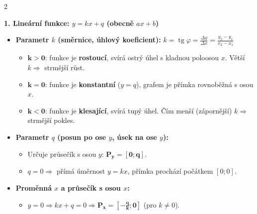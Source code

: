 \documentclass[9pt,a4paper]{article}
\begin{document}
\begin{tcolorbox}[secbox,title=OKRUH 4: LINEÁRNÍ A KVADRATICKÉ FUNKCE -- ROZBOR PARAMETRŮ A GRAFY]
\begin{multicols}{2}

\textbf{\large 1. Lineární funkce: $y = kx + q$ (obecně $ax + b$)}
\begin{itemize}
  \item \textbf{Parametr $k$ (směrnice, úhlový koeficient):} $k = \operatorname{tg} \varphi = \frac{\Delta y}{\Delta x} = \frac{y_2 - y_1}{x_2 - x_1}$
  \begin{itemize}
    \item $\mathbf{k > 0}$: funkce je \textbf{rostoucí}, svírá ostrý úhel s kladnou poloosou $x$. Větší $k \Rightarrow$ strmější růst.
    \item $\mathbf{k = 0}$: funkce je \textbf{konstantní} ($y = q$), grafem je přímka rovnoběžná s osou $x$.
    \item $\mathbf{k < 0}$: funkce je \textbf{klesající}, svírá tupý úhel. Čím menší (zápornější) $k \Rightarrow$ strmější pokles.
  \end{itemize}
  \item \textbf{Parametr $q$ (posun po ose $y$, úsek na ose $y$):}
  \begin{itemize}
    \item Určuje průsečík s osou $y$: $\mathbf{P_y = [0; q]}$.
    \item $q = 0 \Rightarrow$ přímá úměrnost $y = kx$, přímka prochází počátkem $[0;0]$.
  \end{itemize}
  \item \textbf{Proměnná $x$ a průsečík s osou $x$:}
  \begin{itemize}
    \item $y = 0 \Rightarrow kx + q = 0 \Rightarrow \mathbf{P_x = \left[-\frac{q}{k}; 0\right]}$ (pro $k \neq 0$).
  \end{itemize}
\end{itemize}

\begin{center}
\end{center}


\end{multicols}
\end{tcolorbox}
\end{document}
